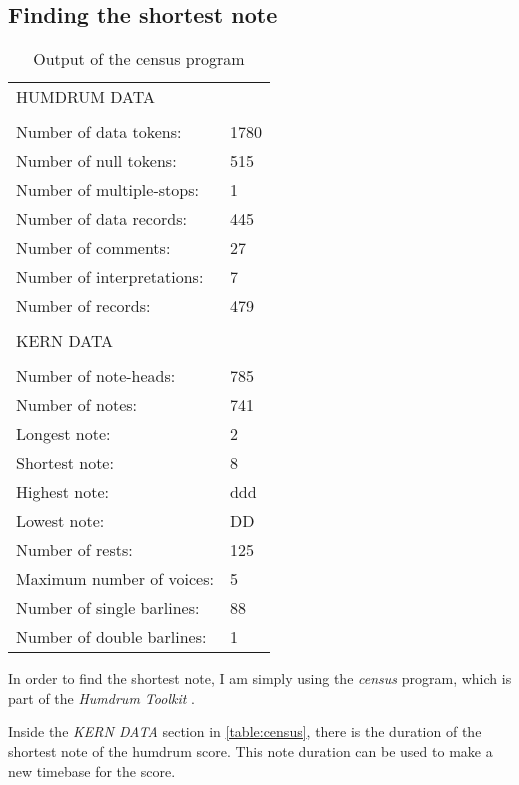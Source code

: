 	\subsection{Finding the shortest note}
		\begin{table}[]
		\centering
		\begin{tabular}{ll}
		HUMDRUM DATA &  \\
		 &  \\
		Number of data tokens: & 1780 \\
		Number of null tokens: & 515 \\
		Number of multiple-stops: & 1 \\
		Number of data records: & 445 \\
		Number of comments: & 27 \\
		Number of interpretations: & 7 \\
		Number of records: & 479 \\
		 &  \\
		KERN DATA &  \\
		 &  \\
		Number of note-heads: & 785 \\
		Number of notes: & 741 \\
		Longest note: & 2 \\
		Shortest note: & 8 \\
		Highest note: & ddd \\
		Lowest note: & DD \\
		Number of rests: & 125 \\
		Maximum number of voices: & 5 \\
		Number of single barlines: & 88 \\
		Number of double barlines: & 1
		\end{tabular}
		\caption{Output of the census program}
		\label{table:census}
		\end{table}

		In order to find the shortest note, I am simply using the \emph{census} program, which is part of the \emph{Humdrum Toolkit} \cite{humdrum}.

		Inside the \emph{KERN DATA} section in \autoref{table:census}, there is the duration of the shortest note of the humdrum score. This note duration can be used to make a new timebase for the score.

